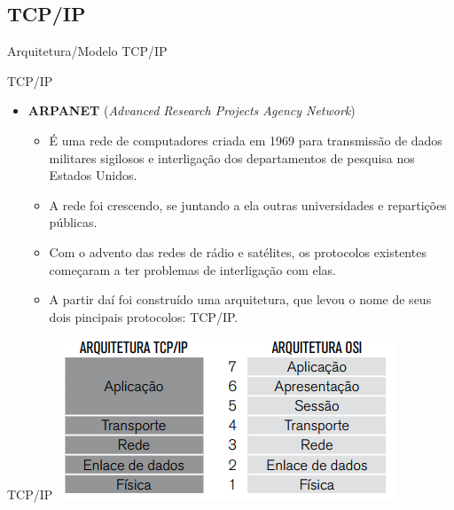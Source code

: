 \documentclass{libs/ufc_format}
\begin{document}
\subsection{TCP/IP}

\begin{frame}{}
    \centering
    \Large
    Arquitetura/Modelo TCP/IP
\end{frame}

\begin{frame}{TCP/IP}
    \begin{itemize}
        \justifying
        \item \textbf{ARPANET} (\textit{Advanced Research Projects Agency Network})
            \begin{itemize}
                \justifying
                \item É uma rede de computadores criada em 1969 para transmissão de dados militares sigilosos e interligação dos departamentos de pesquisa nos Estados Unidos.
                \item<2-> A rede foi crescendo, se juntando a ela outras universidades e repartições públicas.
                \item<3-> Com o advento das redes de rádio e satélites, os protocolos existentes começaram a ter problemas de interligação com elas.
                \item<4-> A partir daí foi construído uma arquitetura, que levou o nome de seus dois pincipais protocolos: TCP/IP.
            \end{itemize}
    \end{itemize}
\end{frame}

\begin{frame}{TCP/IP}
    \centering
    \includegraphics[width=\textwidth]{media/OSI e TCP}
\end{frame}
\end{document}
